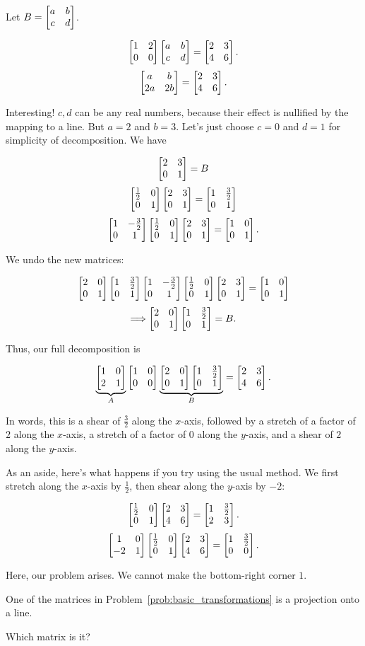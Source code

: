 \documentclass[../gatm_answers.tex]{subfiles}
\begin{document}
\begin{iinner_problem}
\begin{iinner_problem}
\begin{iinner_problem}
Let $B=\begin{bmatrix} a & b \\ c & d \end{bmatrix}$.

$$\begin{bmatrix} 1 & 2 \\ 0 & 0 \end{bmatrix}\begin{bmatrix} a & b \\ c & d \end{bmatrix}=\begin{bmatrix} 2 & 3 \\ 4 & 6 \end{bmatrix}.$$
$$\begin{bmatrix} a & b \\ 2a & 2b \end{bmatrix}=\begin{bmatrix} 2 & 3 \\ 4 & 6 \end{bmatrix}.$$

Interesting! $c,d$ can be any real numbers, because their effect is nullified by the mapping to a line. But $a=2$ and $b=3$. Let's just choose $c=0$ and $d=1$ for simplicity of decomposition. We have

$$\begin{bmatrix} 2 & 3 \\ 0 & 1 \end{bmatrix}=B$$
$$\begin{bmatrix} \frac{1}{2} & 0 \\ 0 & 1 \end{bmatrix}\begin{bmatrix} 2 & 3 \\ 0 & 1 \end{bmatrix}=\begin{bmatrix} 1 & \frac{3}{2} \\ 0 & 1 \end{bmatrix}$$
$$\begin{bmatrix} 1 & -\frac{3}{2} \\ 0 & 1 \end{bmatrix}\begin{bmatrix} \frac{1}{2} & 0 \\ 0 & 1 \end{bmatrix}\begin{bmatrix} 2 & 3 \\ 0 & 1 \end{bmatrix}=\begin{bmatrix} 1 & 0 \\ 0 & 1 \end{bmatrix}.$$

We undo the new matrices:

$$\begin{bmatrix} 2 & 0 \\ 0 & 1 \end{bmatrix}\begin{bmatrix} 1 & \frac{3}{2} \\ 0 & 1 \end{bmatrix}\begin{bmatrix} 1 & -\frac{3}{2} \\ 0 & 1 \end{bmatrix}\begin{bmatrix} \frac{1}{2} & 0 \\ 0 & 1 \end{bmatrix}\begin{bmatrix} 2 & 3 \\ 0 & 1 \end{bmatrix}=\begin{bmatrix} 1 & 0 \\ 0 & 1 \end{bmatrix}$$
$$\Longrightarrow \begin{bmatrix} 2 & 0 \\ 0 & 1 \end{bmatrix}\begin{bmatrix} 1 & \frac{3}{2} \\ 0 & 1 \end{bmatrix} = B.$$

Thus, our full decomposition is

$$\underbrace{\begin{bmatrix} 1 & 0 \\ 2 & 1 \end{bmatrix}}_{A}\begin{bmatrix} 1 & 0 \\ 0 & 0 \end{bmatrix}\underbrace{\begin{bmatrix} 2 & 0 \\ 0 & 1 \end{bmatrix}\begin{bmatrix} 1 & \frac{3}{2} \\ 0 & 1 \end{bmatrix}}_{B}=\begin{bmatrix} 2 & 3 \\ 4 & 6 \end{bmatrix}.$$

In words, this is a shear of $\frac{3}{2}$ along the $x$-axis, followed by a stretch of a factor of $2$ along the $x$-axis, a stretch of a factor of $0$ along the $y$-axis, and a shear of $2$ along the $y$-axis.

As an aside, here's what happens if you try using the usual method. We first stretch along the $x$-axis by $\frac{1}{2}$, then shear along the $y$-axis by $-2$:

$$\begin{bmatrix} \frac{1}{2} & 0 \\ 0 & 1 \end{bmatrix}\begin{bmatrix} 2 & 3 \\ 4 & 6 \end{bmatrix} = \begin{bmatrix} 1 & \frac{3}{2} \\ 2 & 3 \end{bmatrix}.$$
$$\begin{bmatrix} 1 & 0 \\ -2 & 1 \end{bmatrix}\begin{bmatrix} \frac{1}{2} & 0 \\ 0 & 1 \end{bmatrix}\begin{bmatrix} 2 & 3 \\ 4 & 6 \end{bmatrix} = \begin{bmatrix} 1 & \frac{3}{2} \\ 0 & 0 \end{bmatrix}.$$

Here, our problem arises. We cannot make the bottom-right corner $1$.

\begin{outer_problem}
\item One of the matrices in Problem~\ref{prob:basic_transformations} is a projection onto a line.
\end{outer_problem}

\begin{inner_problem}[start=1]
\item Which matrix is it?
\end{inner_problem}


\end{iinner_problem}
\end{iinner_problem}
\end{iinner_problem}
\end{document}
